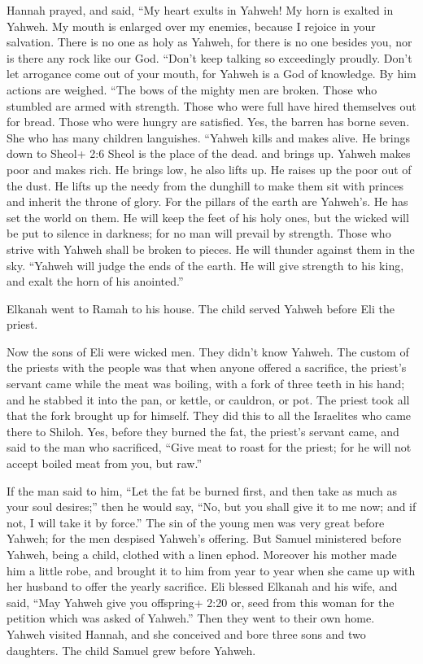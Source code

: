 Hannah prayed, and said, ``My heart exults in Yahweh! My
horn is exalted in Yahweh. My mouth is enlarged over my enemies, because
I rejoice in your salvation.  There is no one as holy as
Yahweh, for there is no one besides you, nor is there any rock like our
God.  ``Don't keep talking so exceedingly proudly. Don't let
arrogance come out of your mouth, for Yahweh is a God of knowledge. By
him actions are weighed.  ``The bows of the mighty men are
broken. Those who stumbled are armed with strength.  Those
who were full have hired themselves out for bread. Those who were hungry
are satisfied. Yes, the barren has borne seven. She who has many
children languishes.  ``Yahweh kills and makes alive. He
brings down to Sheol+ 2:6 Sheol is the place of the dead. and brings up.
 Yahweh makes poor and makes rich. He brings low, he also
lifts up.  He raises up the poor out of the dust. He lifts
up the needy from the dunghill to make them sit with princes and inherit
the throne of glory. For the pillars of the earth are Yahweh's. He has
set the world on them.  He will keep the feet of his holy
ones, but the wicked will be put to silence in darkness; for no man will
prevail by strength.  Those who strive with Yahweh shall be
broken to pieces. He will thunder against them in the sky. ``Yahweh will
judge the ends of the earth. He will give strength to his king, and
exalt the horn of his anointed.''

 Elkanah went to Ramah to his house. The child served
Yahweh before Eli the priest.

 Now the sons of Eli were wicked men. They didn't know
Yahweh.  The custom of the priests with the people was that
when anyone offered a sacrifice, the priest's servant came while the
meat was boiling, with a fork of three teeth in his hand; 
and he stabbed it into the pan, or kettle, or cauldron, or pot. The
priest took all that the fork brought up for himself. They did this to
all the Israelites who came there to Shiloh.  Yes, before
they burned the fat, the priest's servant came, and said to the man who
sacrificed, ``Give meat to roast for the priest; for he will not accept
boiled meat from you, but raw.''

 If the man said to him, ``Let the fat be burned first, and
then take as much as your soul desires;'' then he would say, ``No, but
you shall give it to me now; and if not, I will take it by force.''
 The sin of the young men was very great before Yahweh; for
the men despised Yahweh's offering.  But Samuel ministered
before Yahweh, being a child, clothed with a linen ephod. 
Moreover his mother made him a little robe, and brought it to him from
year to year when she came up with her husband to offer the yearly
sacrifice.  Eli blessed Elkanah and his wife, and said,
``May Yahweh give you offspring+ 2:20 or, seed from this woman for the
petition which was asked of Yahweh.'' Then they went to their own home.
 Yahweh visited Hannah, and she conceived and bore three
sons and two daughters. The child Samuel grew before Yahweh.

